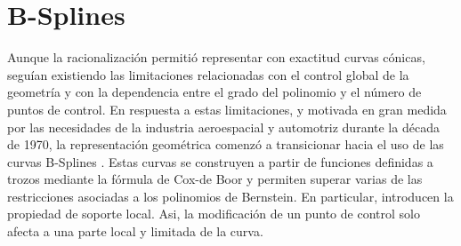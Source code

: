 \documentclass[11pt]{book}
\theoremstyle{plain} %
\theoremstyle{definition} %
\theoremstyle{definition} %
\begin{document}

%        
%        

\section{B-Splines}

Aunque la racionalización permitió representar con exactitud curvas cónicas, seguían existiendo las limitaciones relacionadas con el control
global de la geometría y con la dependencia entre el grado del polinomio y el número de puntos de control. En respuesta a estas limitaciones,
y motivada en gran medida por las necesidades de la industria aeroespacial y automotriz durante la década de 1970, la representación geométrica
comenzó a transicionar hacia el uso de las curvas B-Splines \cite{piegl_nurbs_2012}.
Estas curvas se construyen a partir de funciones definidas a trozos mediante la fórmula de Cox-de Boor y
permiten superar varias de las restricciones asociadas a los polinomios de Bernstein.
En particular, introducen la propiedad de soporte local. Asi, la modificación de un punto de
control solo afecta a una parte local y limitada de la curva.
\end{document}
